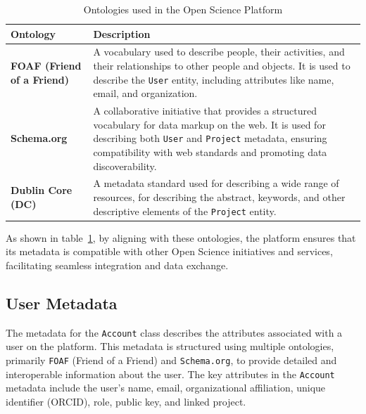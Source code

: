 \documentclass[final]{rc-book-2.14}
\begin{document}
\begin{table}[h]
    \centering
    \renewcommand{\arraystretch}{1.2}
    \begin{tabularx}{\textwidth}{|l|X|}            \hline
        \textbf{Ontology}                  & \textbf{Description}                                                                                                                                                                                                                                   \\ \hline
        \textbf{FOAF (Friend of a Friend)} & A vocabulary used to describe people, their activities, and their relationships to other people and objects. It is used to describe the \texttt{User} entity, including attributes like name, email, and organization.                                 \\ \hline
        \textbf{Schema.org}                & A collaborative initiative that provides a structured vocabulary for data markup on the web. It is used for describing both \texttt{User} and \texttt{Project} metadata, ensuring compatibility with web standards and promoting data discoverability. \\ \hline
        \textbf{Dublin Core (DC)}          & A metadata standard used for describing a wide range of resources, for describing the abstract, keywords, and other descriptive elements of the \texttt{Project} entity.                                                                               \\ \hline
    \end{tabularx}
    \caption{Ontologies used in the Open Science Platform}
    \label{tab:ontologies}
\end{table}


As shown in table~\ref{tab:ontologies}, by aligning with these ontologies, the platform ensures that its metadata is compatible with other Open Science initiatives and services, facilitating seamless integration and data exchange.




\subsection{User Metadata}
The metadata for the \texttt{Account} class describes the attributes associated with a user on the platform. This metadata is structured using multiple ontologies, primarily \texttt{FOAF} (Friend of a Friend) and \texttt{Schema.org}, to provide detailed and interoperable information about the user. The key attributes in the \texttt{Account} metadata include the user's name, email, organizational affiliation, unique identifier (ORCID), role, public key, and linked project.
\end{document}
